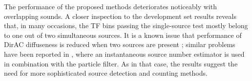 The performance of the proposed methods deteriorates noticeably with overlapping sounds.
A closer inspection to the development set results reveals that, in many occasions, the TF bins passing the single-source test mostly belong to one out of two simultaneous sources. 
It is a known issue that performance of DirAC diffuseness is reduced when two sources are present \cite{epain2016spherical}; similar problems have been reported in \cite{adavanne2019localization}, where an instantaneous source number estimator is used in combination with the particle filter.
As in that case, the results suggest the need for more sophisticated source detection and counting methods. \\








